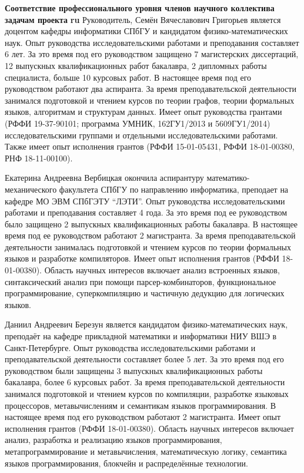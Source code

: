 \documentclass[12pt]{article}  %
\theoremstyle{remark}
\begin{document}
\textbf{Соответствие профессионального уровня членов научного коллектива задачам проекта}
\textbf{ru}
Руководитель, Семён Вячеславович Григорьев является доцентом кафедры информатики СПбГУ и кандидатом физико-математических наук.
Опыт руководства исследовательскими работами и преподавания составляет 6 лет.
За это время под его руководством защищено 7 магистерских диссертаций, 12 выпускных квалификационных работ бакалавра, 2 дипломных работы специалиста, больше 10 курсовых работ.
В настоящее время под его руководством работают два аспиранта.
За время преподавательской деятельности занимался подготовкой и чтением курсов по теории графов, теории формальных языков, алгоритмам и структурам данных.
Имеет опыт руководства грантами (РФФИ 19-37-90101; программа УМНИК, 162ГУ1/2013 и 5609ГУ1/2014) исследовательскими группами и отдельными исследовательскими работами.
Также имеет опыт исполнения грантов (РФФИ 15-01-05431, РФФИ 18-01-00380, РНФ 18-11-00100).

Екатерина Андреевна Вербицкая окончила аспирантуру математико-механического факультета СПбГУ по направлению информатика, преподает на кафедре МО ЭВМ СПбГЭТУ ``ЛЭТИ''.
Опыт руководства исследовательскими работами и преподавания составляет 4 года.
За это время под ее руководством было защищено 2 выпускных квалификационных работы бакалавра.
В настоящее время под ее руководством работают 2 магистранта.
За время преподавательской деятельности занималась подготовкой и чтением курсов по теории формальных языков и разработке компиляторов.
Имеет опыт исполнения грантов (РФФИ 18-01-00380).
Область научных интересов включает анализ встроенных языков, синтаксический анализ при помощи парсер-комбинаторов, функциональное программирование, суперкомпиляцию и частичную дедукцию для логических языков.

Даниил Андреевич Березун является кандидатом физико-математических наук, преподаёт на кафедре прикладной математики и информатики НИУ ВШЭ в Санкт-Петербурге. Опыт руководства исследовательскими работами и преподавательской деятельности составляет более 5 лет. За это время под его руководством были защищены 3 выпускных квалификационных работы бакалавра, более 6 курсовых работ. За время преподавательской деятельности занимался подготовкой и чтением курсов по компиляции, разработке языковых процессоров, метавычислениям и семантикам языков программирования. В настоящее время под его руководством работают 2 магистранта. Имеет опыт исполнения грантов (РФФИ 18-01-00380). Область научных интересов включает анализ, разработка и реализацию языков программирования,  метапрограммирование и метавычисления, математическую логику, семантика языков программирования, блокчейн и распределённые технологии.
\end{document}
